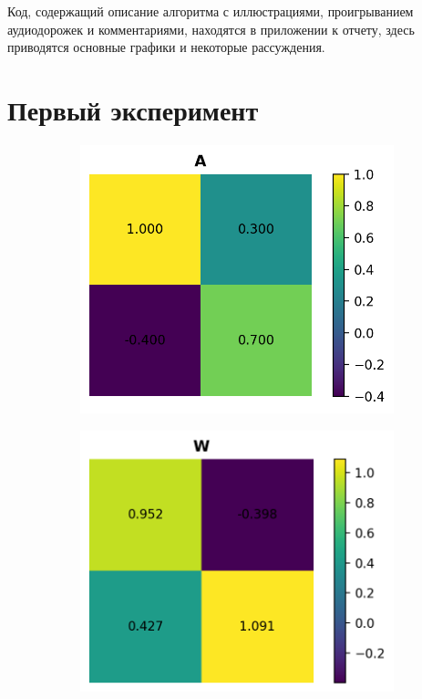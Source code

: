 \documentclass[a4paper,12pt]{article}
\begin{document}
	Код, содержащий описание алгоритма с иллюстрациями, проигрыванием аудиодорожек и комментариями, находятся в приложении к отчету, здесь приводятся основные графики и некоторые рассуждения.
	
	\section*{Первый эксперимент}
	
	\begin{figure}[h!]
		\centering
		\begin{subfigure}{0.3\linewidth}
			\includegraphics[width=\linewidth]{plots/A1}
		\end{subfigure}
		\begin{subfigure}{0.3\linewidth}
			\includegraphics[width=\linewidth]{plots/W1}

\end{subfigure}
\end{figure}
\end{document}
